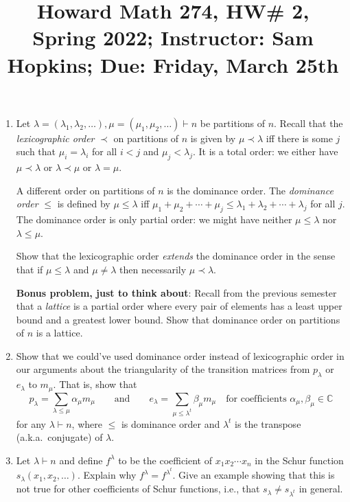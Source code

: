 \documentclass[11pt]{article}
\title{Howard Math 274, HW\# 2, \\ {\normalsize Spring 2022; Instructor: Sam Hopkins; Due: Friday, March 25th}}
\date{}
\begin{document}
\maketitle

\thispagestyle{empty}

\vspace{-1.5cm}

\begin{enumerate}

\item Let $\lambda=(\lambda_1,\lambda_2,\ldots), \mu=(\mu_1,\mu_2,\ldots) \vdash n$ be partitions of $n$. Recall that the \emph{lexicographic order} $\prec$ on partitions of $n$ is given by $\mu \prec \lambda$ iff there is some $j$ such that $\mu_i=\lambda_i$ for all $i < j$ and $\mu_j < \lambda_j$. It is a total order: we either have $\mu \prec \lambda$ or $\lambda \prec \mu$ or $\lambda = \mu$.

A different order on partitions of $n$ is the dominance order. The \emph{dominance order} $\leq$ is defined by $\mu \leq \lambda$ iff $\mu_1 + \mu_2 + \cdots + \mu_j \leq \lambda_1 + \lambda_2 + \cdots + \lambda_j$ for all $j$. The dominance order is only partial order: we might have neither $\mu \leq \lambda$ nor $\lambda \leq \mu$.

Show that the lexicographic order \emph{extends} the dominance order in the sense that if $\mu \leq \lambda$ and $\mu \neq \lambda$ then necessarily $\mu \prec \lambda$.

{\bf Bonus problem, just to think about}: Recall from the previous semester that a \emph{lattice} is a partial order where every pair of elements has a least upper bound and a greatest lower bound. Show that dominance order on partitions of $n$ is a lattice.

\item Show that we could've used dominance order instead of lexicographic order in our arguments about the triangularity of the transition matrices from $p_{\lambda}$ or $e_{\lambda}$ to $m_{\mu}$. That is, show that
\[ p_{\lambda} = \sum_{\lambda \leq \mu} \alpha_{\mu} m_{\mu} \qquad \textrm{and} \qquad e_{\lambda} = \sum_{\mu \leq \lambda^t} \beta_{\mu} m_{\mu} \quad \textrm{for coefficients $\alpha_{\mu},\beta_{\mu}\in\mathbb{C}$}\]
for any $\lambda \vdash n$, where $\leq$ is dominance order and $\lambda^t$ is the transpose (a.k.a.~conjugate) of $\lambda$.

\item Let $\lambda \vdash n$ and define $f^{\lambda}$ to be the coefficient of $x_1x_2\cdots x_n$ in the Schur function $s_{\lambda}(x_1,x_2,\ldots)$. Explain why $f^{\lambda} = f^{\lambda^t}$. Give an example showing that this is not true for other coefficients of Schur functions, i.e., that $s_{\lambda} \neq s_{\lambda^t}$ in general.


\end{enumerate}
\end{document}

